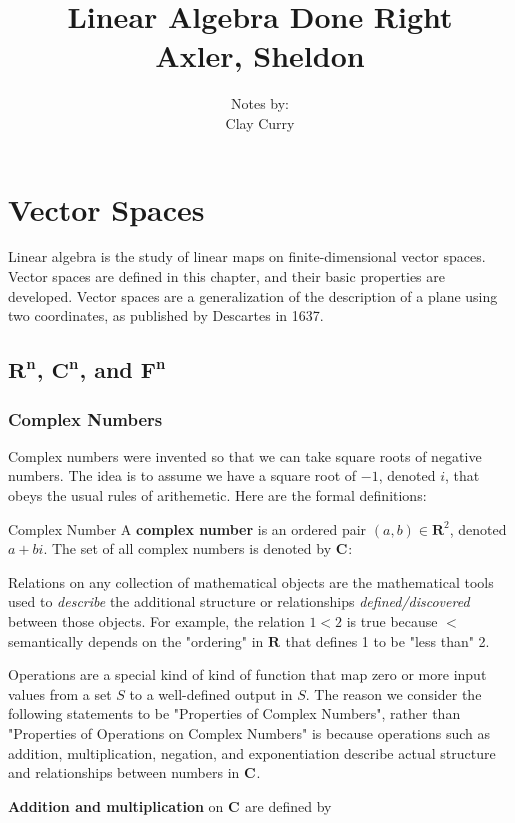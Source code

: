 \documentclass[11pt]{article} %
\title{Linear Algebra Done Right \\ Axler, Sheldon}
\author{Notes by:  \\ Clay Curry}
\date{}
\newcommand\R[1]{\mathbf{R^{#1}}}
\newcommand\C[1]{\mathbf{C^{#1}}}
\newcommand\F[1]{\mathbf{F^{#1}}}
\begin{document}
\section{Vector Spaces}

Linear algebra is the study of linear maps on finite-dimensional vector spaces. Vector spaces are defined in this chapter, and their basic properties are developed. Vector spaces are a generalization of the description of a plane using two coordinates, as published by Descartes in 1637. 

\subsection{$\R{n}$, $\C{n}$, and $\F{n}$}

\subsubsection{Complex Numbers}
Complex numbers were invented so that we can take square roots of negative numbers. The idea is to assume we have a square root of $-1$, denoted $i$, that obeys the usual rules of arithemetic. Here are the formal definitions:

{Complex Number}
{
A \textbf{complex number} is an ordered pair $(a,b) \in \mathbf{R}^2$, denoted $a + bi$. 
	\points
	{
	The set of all complex numbers is denoted by $\C{ }$: 
	\mathdiv{\C{ } = \{a+bi : a,b \in \R{ } \}}
	}
}

Relations on any collection of mathematical objects are the mathematical tools used to \textit{describe} the additional structure or relationships \textit{defined/discovered} between those objects. For example, the relation $1 < 2$ is true because $<$ semantically depends on the "ordering" in $\R{}$ that defines 1 to be "less than" 2. 

Operations are a special kind of kind of function that map zero or more input values from a set $S$ to a well-defined output in $S$. The reason we consider the following statements to be "Properties of Complex Numbers", rather than "Properties of Operations on Complex Numbers" is because operations such as addition, multiplication, negation, and exponentiation describe actual structure and relationships between numbers in $\C{}$.

{
\textbf{Addition and multiplication} on $\C{ }$ are defined by
}
\end{document}

